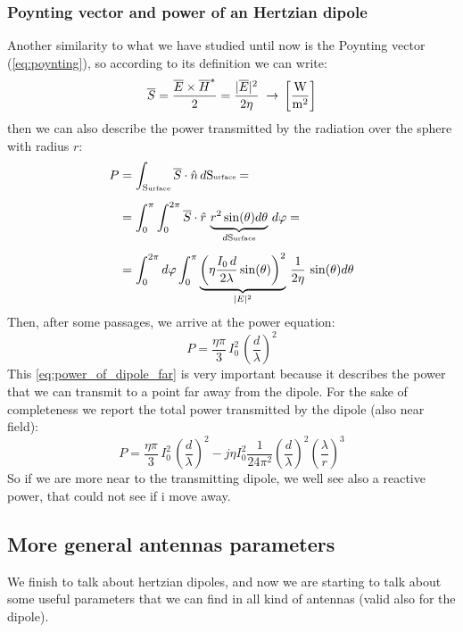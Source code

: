 \subsubsection*{Poynting vector and power of an Hertzian dipole}
Another similarity to what we have studied until now is the Poynting vector (\cref{eq:poynting}), so according to its definition we can write:
\begin{equation}
        \overline{S}=\frac{\overline{E}\times\overline{H}^*}{2}=\frac{|\overline{E}|^2}{2\eta}\;\rightarrow\,\left[\si{\frac{\watt}{\metre^2}}\right]
\end{equation}
then we can also describe the power transmitted by the radiation over the sphere with radius $r$:
\begin{align}
    \begin{split}
        P&=\int_{\text{S\tiny{urface}}}\overline{S}\cdot\hat{n}\, d\text{S\tiny{urface}}=\\[5pt]
        &=\int_0^\pi\int_0^{2\pi}\overline{S}\cdot\hat{r}\,\underbrace{r^2\sin(\theta)d\theta}_{d\text{S\tiny{urface}}}\,d\varphi=\\[5pt]
        &=\int_0^{2\pi}d\varphi\int_0^\pi \underbrace{\left(\eta\frac{I_0\,d}{2\lambda}\sin(\theta)\right)^2}_{|E|^2}\,\frac{1}{2\eta}\,\sin(\theta)d\theta
    \end{split}
\end{align}
Then, after some passages, we arrive at the power equation:
\begin{equation}\label{eq:power_of_dipole_far}
    P=\frac{\eta \pi}{3}\,I_0^2\,\left(\frac{d}{\lambda}\right)^2
\end{equation}
This \cref{eq:power_of_dipole_far} is very important because it describes the power that we can transmit to a point far away from the dipole. For the sake of completeness we report the total power transmitted by the dipole (also near field):
\begin{equation}
    P=\frac{\eta \pi}{3}\,I_0^2\,\left(\frac{d}{\lambda}\right)^2-j\eta I_0^2\frac{1}{24\pi^2}\left(\frac{d}{\lambda}\right)^2\left(\frac{\lambda}{r}\right)^3
\end{equation}
So if we are more near to the transmitting dipole, we well see also a reactive power, that could not see if i move away.
\subsection*{More general antennas parameters}
We finish to talk about hertzian dipoles, and now we are starting to talk about some useful parameters that we can find in all kind of antennas (valid also for the dipole).
